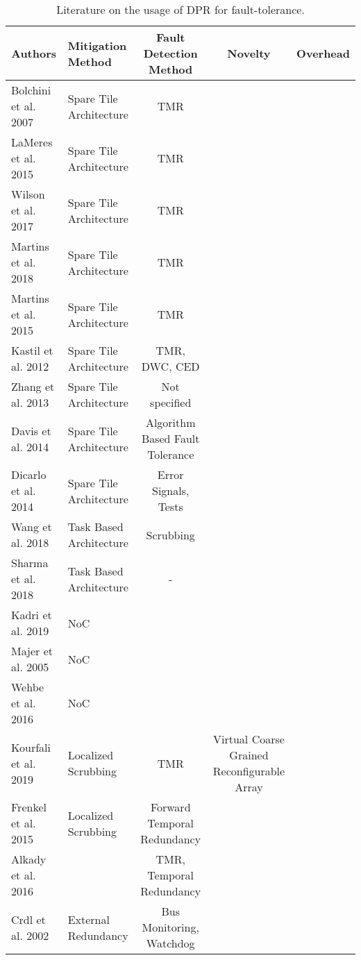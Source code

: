\begin{table*}
    \caption{Literature on the usage of \gls{DPR} for fault-tolerance.}
    \begin{tabular*}{\textwidth}{@{\extracolsep{\fill}}llccc}
        \toprule
       \textbf{Authors} & \textbf{Mitigation Method} & \textbf{Fault Detection Method} & \textbf{Novelty} & \textbf{Overhead} \\
       \midrule
       \cite{bolchini2007} Bolchini et al. 2007        & Spare Tile Architecture      & TMR & \\
       \cite{lameres_radsat_2015} LaMeres et al. 2015       & Spare Tile Architecture      & TMR & \\
       \cite{wilson_hybrid_2017} Wilson et al. 2017         & Spare Tile Architecture      & TMR & \\
       \cite{martins_dynamic_2018} Martins et al. 2018      & Spare Tile Architecture      & TMR & \\
       \cite{martins_tmr_2015} Martins et al. 2015          & Spare Tile Architecture      & TMR & \\
       \cite{kastil2012} Kastil et al. 2012                 & Spare Tile Architecture      & TMR, DWC, CED  &\\
       \cite{zhang2013} Zhang et al. 2013                   & Spare Tile Architecture      & Not specified &\\
       \cite{davis2014} Davis et al. 2014                   & Spare Tile Architecture      & Algorithm Based Fault Tolerance &\\
       \cite{dicarlo2014} Dicarlo et al. 2014               & Spare Tile Architecture      & Error Signals, Tests &\\
       \cite{wang_dynamic_2018} Wang et al. 2018            & Task Based Architecture      & Scrubbing & \\
       \cite{sharma_run-time_2018} Sharma et al. 2018       & Task Based Architecture      & - & \\
       \cite{kadri_survey_2019} Kadri et al. 2019           & NoC                          & &\\
       \cite{majer_packet_2005} Majer et al. 2005           & NoC                          & &\\
       \cite{wehbe_secure_2016} Wehbe et al. 2016           & NoC                          & &\\
       \cite{kourfali2019} Kourfali et al. 2019             & Localized Scrubbing           & TMR & Virtual Coarse Grained Reconfigurable Array\\
       \cite{frenkel2015} Frenkel et al. 2015             & Localized Scrubbing       & Forward Temporal Redundancy &\\
       \cite{alkady_integration_2016} Alkady et al. 2016             &              & TMR, Temporal Redundancy &\\
       \cite{crdl_fail-safe_2002} Crdl et al. 2002          & External Redundancy           & Bus Monitoring, Watchdog &\\
       \bottomrule
    \end{tabular*}
\end{table*}


